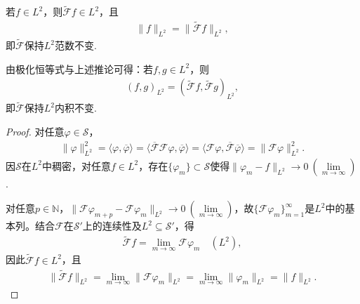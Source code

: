 \documentclass[../../main.tex]{subfiles}%
\begin{document}
\begin{corollary}
若$f\in L^2$，则$\widetilde{\mathscr{F}}f\in L^2$，且
\begin{align}
\|f\|_{L^2}=\|\widetilde{\mathscr{F}}f\|_{L^2},\label{eq:plancherel}
\end{align}
即$\widetilde{\mathscr{F}}$保持$L^2$范数不变.
\end{corollary}
\begin{remark}
由极化恒等式与上述推论可得：若$f,g\in L^2$，则
\begin{align}
(f,g)_{L^2}=(\widetilde{\mathscr{F}}f,\widetilde{\mathscr{F}}g)_{L^2},\label{eq:innerprodft}
\end{align}
即$\widetilde{\mathscr{F}}$保持$L^2$内积不变.
\end{remark}
\begin{proof}

对任意$\varphi\in\mathscr{S}$，
\begin{align*}
\|\varphi\|_{L^2}^2=\langle\varphi,\overline{\varphi}\rangle=\langle\overline{\mathscr{F}}\mathscr{F}\varphi,\overline{\varphi}\rangle=\langle\mathscr{F}\varphi,\overline{\mathscr{F}}\overline{\varphi}\rangle=\|\mathscr{F}\varphi\|_{L^2}^2.
\end{align*}
因$\mathscr{S}$在$L^2$中稠密，对任意$f\in L^2$，存在$\{\varphi_m\}\subset\mathscr{S}$使得$\|\varphi_m-f\|_{L^2}\to0\ (\lim\limits_{m\to\infty})$.

对任意$p\in\mathbb{N}$，$\|\mathscr{F}\varphi_{m+p}-\mathscr{F}\varphi_m\|_{L^2}\to0\ (\lim\limits_{m\to\infty})$，故$\{\mathscr{F}\varphi_m\}_{m=1}^\infty$是$L^2$中的基本列。结合$\mathscr{F}$在$\mathscr{S}'$上的连续性及$L^2\subseteq\mathscr{S}'$，得
\begin{align*}
\widetilde{\mathscr{F}}f=\lim\limits_{m\to\infty}\mathscr{F}\varphi_m\quad(L^2),
\end{align*}
因此$\widetilde{\mathscr{F}}f\in L^2$，且
\begin{align*}
\|\widetilde{\mathscr{F}}f\|_{L^2}=\lim\limits_{m\to\infty}\|\mathscr{F}\varphi_m\|_{L^2}=\lim\limits_{m\to\infty}\|\varphi_m\|_{L^2}=\|f\|_{L^2}.
\end{align*}

\end{proof}
\end{document}
